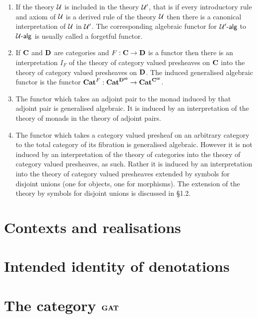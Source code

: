 \begin{examples}

\begin{enumerate}
\item If the theory $\mathcal{U}$ is included in the theory $\mathcal{U}'$, that is if every introductory rule and axiom of $\mathcal{U}$ is a derived rule of the theory $\mathcal{U}$ then there is a canonical interpretation of $\mathcal{U}$ in $\mathcal{U}'$.
%
The corresponding algebraic functor for $\mathcal{U}'\text{-}\mathsf{alg}$ to $\mathcal{U}\text{-}\mathsf{alg}$ is usually called a forgetful functor.

\item If $\mathbf{C}$ and $\mathbf{D}$ are categories and $F:\mathbf{C}\to\mathbf{D}$ is a functor then there is an interpretation $I_F$ of the theory of category valued presheaves on $\mathbf{C}$ into the theory of category valued presheaves on $\mathbf{D}$. The induced generalised algebraic functor is the functor $\mathbf{Cat}^F:\mathbf{Cat}^{\mathbf{D}^{\mathsf{op}}}\to\mathbf{Cat}^{\mathbf{C}^{\mathsf{op}}}$.

\item The functor which takes an adjoint pair to the monad induced by that adjoint pair is generalised algebraic.
%
It is induced by an interpretation of the theory of monads in the theory of adjoint pairs.

\item The functor which takes a category valued presheaf on an arbitrary category to the total category of its fibration is generalised algebraic.
%
 However it is not induced by an interpretation of the theory of categories into the theory of category valued presheaves, as such.
%
 Rather it is induced by an interpretation into the theory of category valued presheaves extended by symbols for disjoint unions (one for objects, one for morphisms).
%
The extension of the theory by symbols for disjoint unions is discussed in \S 1.2.
\end{enumerate}
\end{examples}

\section{Contexts and realisations} \label{sec:source-1-12}

\lipsum[11]

\section{Intended identity of denotations} \label{sec:source-1-13}

\lipsum[12]

\section{The category $\mathbf{GAT}$} \label{sec:source-1-14}

\lipsum[13]

